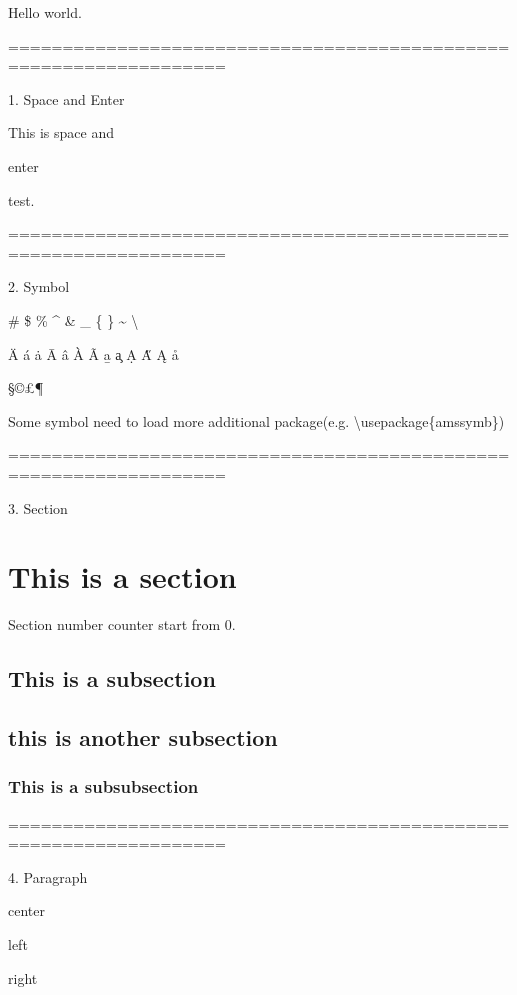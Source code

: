 \documentclass[12pt]{article}
\begin{document}
  Hello world.
  
  ==================================================================
  
  1. Space and Enter
  
  This is                 space
  and
  
  enter
  
  
  
  
  test.
  
  ==================================================================
  
  2. Symbol
  
  \# \$ \% \^{} \& \_{} \{ \} \~{} \textbackslash
  
  \"{A} \'{a} \.{a} \={A} \^{a} \`{A} \~{A} \b{a} \c{a} \d{A} \H{A} \k{A} \r{a}
  
  \S \dag \copyright \pounds \P \ddag
  
  Some symbol need to load more additional package(e.g. \textbackslash usepackage\{amssymb\})
  
  \checkmark \maltese \circledR \yen
  
  ==================================================================
  
  3. Section
  
  \setcounter{section}{1}
  \section{This is a section}
  Section number counter start from 0.
  \subsection{This is a subsection}
  \subsection{this is another subsection}
  \subsubsection{This is a subsubsection}
  
  ==================================================================
  
  4. Paragraph
  
  \begin{center}
  center
  \end{center}
  \begin{flushleft}
  left
  \end{flushleft}
  \begin{flushright}
  right
  \end{flushright}
  
\end{document}
